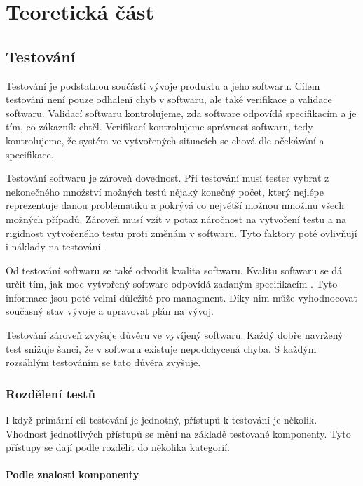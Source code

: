 \chapter{Teoretická část} %

\section{Testování}

Testování je podstatnou součástí vývoje produktu a jeho softwaru. Cílem testování není pouze odhalení chyb v softwaru, ale také verifikace a validace softwaru. Validací softwaru kontrolujeme, zda software odpovídá specifikacím a je tím, co zákazník chtěl. Verifikací kontrolujeme správnost softwaru, tedy kontrolujeme, že systém ve vytvořených situacích se chová dle očekávání a specifikace. \cite{singh2012software}

Testování softwaru je zároveň dovednost. Při testování musí tester vybrat z nekonečného množství možných testů nějaký konečný počet, který nejlépe reprezentuje danou problematiku a pokrývá co největší možnou množinu všech možných případů. Zároveň musí vzít v potaz náročnost na vytvoření testu a na rigidnost vytvořeného testu proti změnám v softwaru. Tyto faktory poté ovlivňují i náklady na testování. \cite{fewster1999software}

Od testování softwaru se také odvodit kvalita softwaru. Kvalitu softwaru se dá určit tím, jak moc vytvořený software odpovídá zadaným specifikacím \cite{software_quality}. Tyto informace jsou poté velmi důležité pro managment. Díky nim může vyhodnocovat současný stav vývoje a upravovat plán na vývoj. 

Testování zároveň zvyšuje důvěru ve vyvíjený softwaru. Každý dobře navržený test snižuje šanci, že v softwaru existuje nepodchycená chyba. S každým rozsáhlým testováním se tato důvěra zvyšuje. \cite{fewster1999software}

\subsection{Rozdělení testů}

I když primární cíl testování je jednotný, přístupů k testování je několik. Vhodnost jednotlivých přístupů se mění na základě testované komponenty. Tyto přístupy se dají podle \cite{luo2001software} rozdělit do několika kategorií.

\subsubsection{Podle znalosti komponenty}


